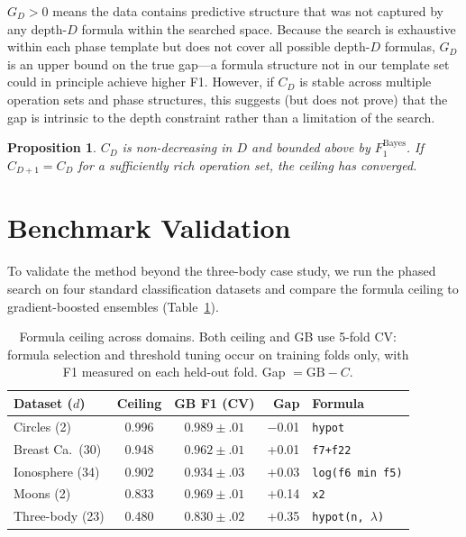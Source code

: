 \documentclass[journal]{IEEEtran}
\newtheorem{proposition}{Proposition}
\begin{document}
$G_D > 0$ means the data contains predictive structure that was not
captured by any depth-$D$ formula within the searched space. Because
the search is exhaustive within each phase template but does not
cover all possible depth-$D$ formulas, $G_D$ is an upper bound on
the true gap---a formula structure not in our template set could in
principle achieve higher F1. However, if $C_D$ is stable across
multiple operation sets and phase structures, this suggests (but
does not prove) that the gap is intrinsic to the depth constraint
rather than a limitation of the search.

\begin{proposition}
$C_D$ is non-decreasing in $D$ and bounded above by
$F_1^{\mathrm{Bayes}}$. If $C_{D+1} = C_D$ for a sufficiently
rich operation set, the ceiling has converged.
\end{proposition}

\section{Benchmark Validation}

To validate the method beyond the three-body case study, we run the
phased search on four standard classification datasets and compare
the formula ceiling to gradient-boosted ensembles (Table~\ref{tab:bench}).

\begin{table}[h]
\caption{Formula ceiling across domains. Both ceiling and GB use
5-fold CV: formula selection and threshold tuning occur on training
folds only, with F1 measured on each held-out fold.
Gap $= \text{GB} - C$.}
\label{tab:bench}
\scriptsize
\begin{tabular}{@{}lccrl@{}}
\toprule
Dataset ($d$) & Ceiling & GB F1 (CV) & Gap & Formula \\
\midrule
Circles (2) & 0.996 & $0.989{\pm}.01$ & $-$0.01 & \texttt{hypot} \\
Breast Ca.\ (30) & 0.948 & $0.962{\pm}.01$ & +0.01 & \texttt{f7+f22} \\
Ionosphere (34) & 0.902 & $0.934{\pm}.03$ & +0.03 & \texttt{log(f6 min f5)} \\
Moons (2) & 0.833 & $0.969{\pm}.01$ & +0.14 & \texttt{x2} \\
Three-body (23) & 0.480 & $0.830{\pm}.02$ & +0.35 & \texttt{hypot(n,\,$\lambda$)} \\
\bottomrule
\end{tabular}
\end{table}
\end{document}
